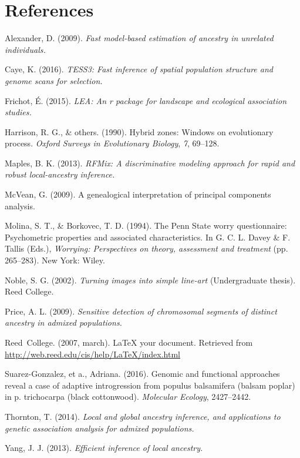 \documentclass[12pt,twoside]{reedthesis}
\theoremstyle{definition}
\theoremstyle{definition}
\theoremstyle{remark}
\begin{document}
  \chapter*{References}\label{references}
  
  \hypertarget{refs}{}
  \hypertarget{ref-alexander2009}{}
  Alexander, D. (2009). \emph{Fast model-based estimation of ancestry in
  unrelated individuals.}
  
  \hypertarget{ref-caye2016}{}
  Caye, K. (2016). \emph{TESS3: Fast inference of spatial population
  structure and genome scans for selection.}
  
  \hypertarget{ref-frichot2015}{}
  Frichot, É. (2015). \emph{LEA: An r package for landscape and ecological
  association studies.}
  
  \hypertarget{ref-harrison1990hybrid}{}
  Harrison, R. G., \& others. (1990). Hybrid zones: Windows on
  evolutionary process. \emph{Oxford Surveys in Evolutionary Biology},
  \emph{7}, 69--128.
  
  \hypertarget{ref-maples2013}{}
  Maples, B. K. (2013). \emph{RFMix: A discriminative modeling approach
  for rapid and robust local-ancestry inference.}
  
  \hypertarget{ref-mcvean2009}{}
  McVean, G. (2009). A genealogical interpretation of principal components
  analysis.
  
  \hypertarget{ref-Molina1994}{}
  Molina, S. T., \& Borkovec, T. D. (1994). The Penn State worry
  questionnaire: Psychometric properties and associated characteristics.
  In G. C. L. Davey \& F. Tallis (Eds.), \emph{Worrying: Perspectives on
  theory, assessment and treatment} (pp. 265--283). New York: Wiley.
  
  \hypertarget{ref-noble2002}{}
  Noble, S. G. (2002). \emph{Turning images into simple line-art}
  (Undergraduate thesis). Reed College.
  
  \hypertarget{ref-price2009}{}
  Price, A. L. (2009). \emph{Sensitive detection of chromosomal segments
  of distinct ancestry in admixed populations.}
  
  \hypertarget{ref-reedweb2007}{}
  Reed~College. (2007, march). LaTeX your document. Retrieved from
  \url{http://web.reed.edu/cis/help/LaTeX/index.html}
  
  \hypertarget{ref-suarez2016}{}
  Suarez-Gonzalez, et a., Adriana. (2016). Genomic and functional
  approaches reveal a case of adaptive introgression from populus
  balsamifera (balsam poplar) in p. trichocarpa (black cottonwood).
  \emph{Molecular Ecology}, 2427--2442.
  
  \hypertarget{ref-thornton2014}{}
  Thornton, T. (2014). \emph{Local and global ancestry inference, and
  applications to genetic association analysis for admixed populations.}
  
  \hypertarget{ref-yang2013}{}
  Yang, J. J. (2013). \emph{Efficient inference of local ancestry.}


\end{document}
